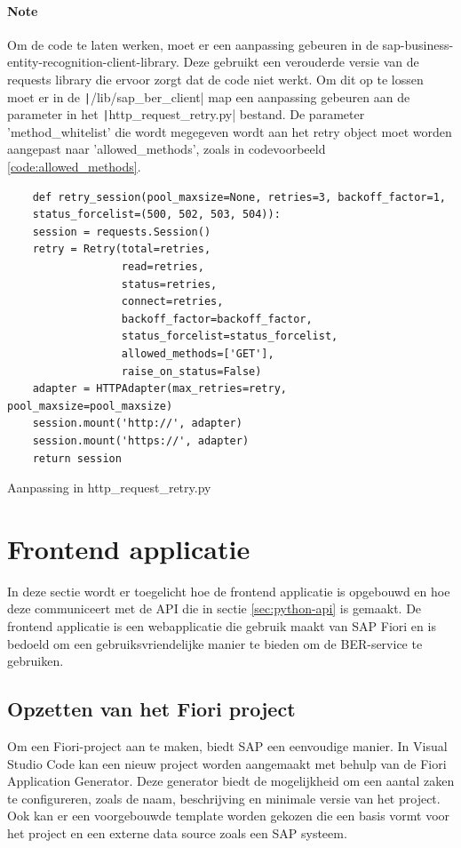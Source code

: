 \paragraph{Note}
Om de code te laten werken, moet er een aanpassing gebeuren in de sap-business-entity-recognition-client-library. Deze gebruikt een verouderde versie van de requests library die ervoor zorgt dat de code niet werkt. Om dit op te lossen moet er in de \texttt|/lib/sap_ber_client| map een aanpassing gebeuren aan de parameter in het \texttt|http_request_retry.py| bestand. De parameter 'method\_whitelist' die wordt megegeven wordt aan het retry object moet worden aangepast naar 'allowed\_methods', zoals in codevoorbeeld \ref{code:allowed_methods}.
\begin{listing}[H]
\begin{verbatim}
    def retry_session(pool_maxsize=None, retries=3, backoff_factor=1,
    status_forcelist=(500, 502, 503, 504)):
    session = requests.Session()
    retry = Retry(total=retries,
                  read=retries,
                  status=retries,
                  connect=retries,
                  backoff_factor=backoff_factor,
                  status_forcelist=status_forcelist,
                  allowed_methods=['GET'],
                  raise_on_status=False)
    adapter = HTTPAdapter(max_retries=retry, pool_maxsize=pool_maxsize)
    session.mount('http://', adapter)
    session.mount('https://', adapter)
    return session
\end{verbatim}
\caption{Aanpassing in http\_request\_retry.py}
\label{code:allowed_methods}
\end{listing}

\section{Frontend applicatie}

In deze sectie wordt er toegelicht hoe de frontend applicatie is opgebouwd en hoe deze communiceert met de API die in sectie \ref{sec:python-api} is gemaakt. De frontend applicatie is een webapplicatie die gebruik maakt van SAP Fiori en is bedoeld om een gebruiksvriendelijke manier te bieden om de BER-service te gebruiken. 

\subsection{Opzetten van het Fiori project}

Om een Fiori-project aan te maken, biedt SAP een eenvoudige manier. In Visual Studio Code kan een nieuw project worden aangemaakt met behulp van de Fiori Application Generator. Deze generator biedt de mogelijkheid om een aantal zaken te configureren, zoals de naam, beschrijving en minimale versie van het project. Ook kan er een voorgebouwde template worden gekozen die een basis vormt voor het project en een externe data source zoals een SAP systeem. 

